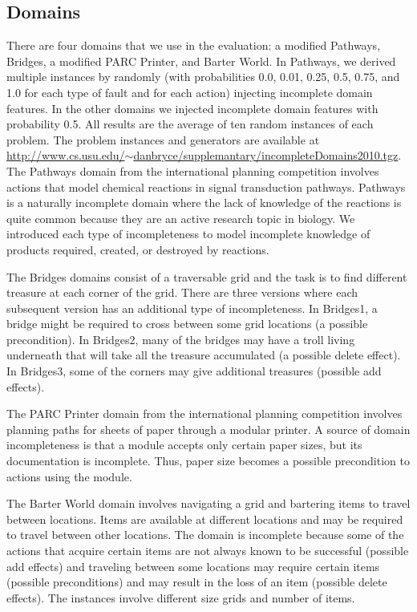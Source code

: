 \documentclass{article}
\begin{document}
\subsection{Domains} There are four domains that we use in the evaluation: a modified Pathways, Bridges,  a modified PARC Printer, and Barter World.  In Pathways, we derived multiple instances by randomly (with probabilities 0.0, 0.01, 0.25, 0.5, 0.75, and 1.0 for each type of fault and for each action) injecting incomplete domain features.  In the other domains we injected incomplete domain features with probability 0.5. All results are the average of ten random instances of each problem. 
The problem instances and generators are available at \href{http://www.cs.usu.edu/~danbryce/supplemantary/incompleteDomains2010.tgz}{http://www.cs.usu.edu/$\sim$danbryce/supplemantary/incompleteDomains2010.tgz}.  
The Pathways domain from the international planning competition involves actions that model chemical reactions in signal transduction pathways.  Pathways is a naturally incomplete domain where the lack of knowledge of the reactions is quite common because they are an active research topic in biology.  We introduced each type of incompleteness to model incomplete knowledge of products required, created, or destroyed by reactions.

The Bridges domains consist of a traversable grid and the task is to find different treasure at each corner of the grid. There are three versions where each subsequent version has an additional type of incompleteness.  In Bridges1, a bridge might be required  to cross between some grid locations (a possible precondition). In Bridges2, many of the bridges may have a troll living underneath that will take all the treasure accumulated (a possible delete effect). In Bridges3, some of the corners may give additional treasures (possible add effects).  


The PARC Printer domain from the international planning competition involves planning paths for sheets of paper through a modular printer.  A source of domain incompleteness is that a module accepts only certain paper sizes, but its documentation is incomplete.  Thus, paper size becomes a possible precondition to actions using the module.  

The Barter World domain involves navigating a grid and bartering items to travel between locations.  Items are available at different locations and may be required to travel between other locations.  The domain is incomplete because some of the actions that acquire certain items are not always known to be successful (possible add effects) and traveling between some locations may require certain items (possible preconditions) and may result in the loss of an item (possible delete effects).  The instances involve different size grids and number of items.
\end{document}
